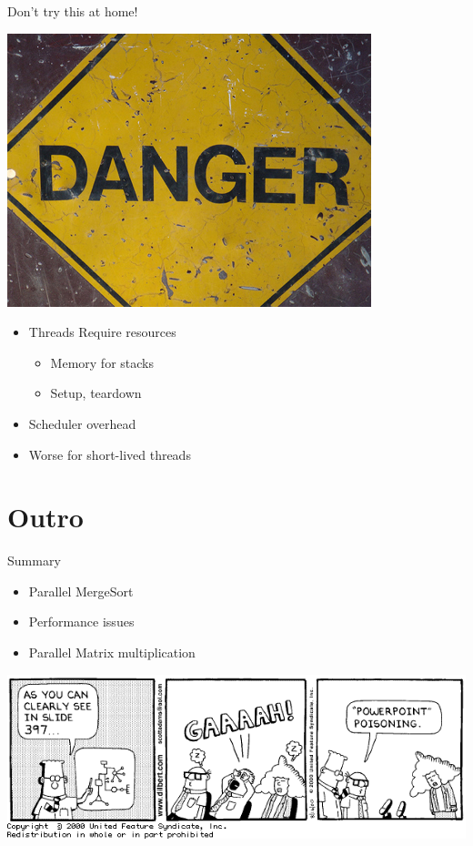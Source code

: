 \begin{frame}{Don't try this at home!}
  \begin{center}
    \includegraphics[scale=0.35]{figures/danger}
  \end{center}


  \begin{itemize}
  \item Threads Require resources
    \begin{itemize}
    \item Memory for stacks
    \item Setup, teardown
    \end{itemize}
  \item Scheduler overhead
  \item Worse for short-lived threads
  \end{itemize}
\end{frame}


\section*{Outro}

\begin{frame}{Summary}
  \begin{itemize}
  \item Parallel MergeSort
  \item Performance issues
  \item Parallel Matrix multiplication
  \end{itemize}


  \begin{center}
    \includegraphics[scale=0.35]{figures/dilbert-2}
  \end{center}
\end{frame}

